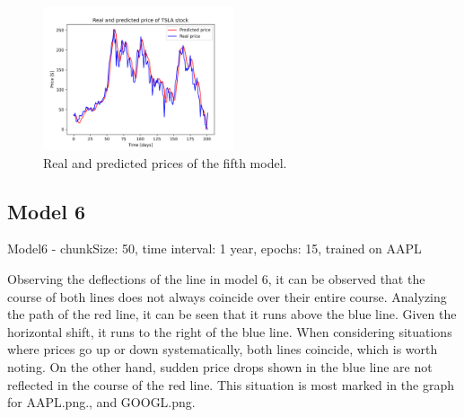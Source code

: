 \begin{figure}
\includegraphics[width=0.5\textwidth]{./graf/model5/TSLA.png}
\caption{Real and predicted prices of the fifth model.}
\label{fig:label}
\end{figure} 

\clearpage
\subsection{Model 6}

Model6 - chunkSize: 50, time interval: 1 year, epochs: 15, trained on AAPL\par\bigskip
Observing the deflections of the line in model 6, it can be observed that the course of both lines does
not always coincide over their entire course. Analyzing the path of the red line, it can be seen that it
runs above the blue line. Given the horizontal shift, it runs to the right of the blue line. When
considering situations where prices go up or down systematically, both lines coincide, which is worth
noting. On the other hand, sudden price drops shown in the blue line are not reflected in the course
of the red line. This situation is most marked in the graph for AAPL.png., and GOOGL.png.

